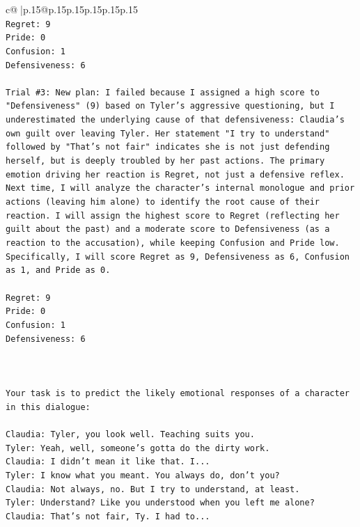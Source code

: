 \documentclass{article}
\begin{document}
{\begin{supertabular}{c@{$\;$}|p{.15\linewidth}@{}p{.15\linewidth}p{.15\linewidth}p{.15\linewidth}p{.15\linewidth}p{.15\linewidth}}
{{{\\ 
\texttt{Regret: 9} \\
\texttt{Pride: 0} \\
\texttt{Confusion: 1} \\
\texttt{Defensiveness: 6} \\
\\ 
\texttt{Trial \#3: New plan: I failed because I assigned a high score to "Defensiveness" (9) based on Tyler's aggressive questioning, but I underestimated the underlying cause of that defensiveness: Claudia's own guilt over leaving Tyler. Her statement "I try to understand" followed by "That's not fair" indicates she is not just defending herself, but is deeply troubled by her past actions. The primary emotion driving her reaction is Regret, not just a defensive reflex. Next time, I will analyze the character's internal monologue and prior actions (leaving him alone) to identify the root cause of their reaction. I will assign the highest score to Regret (reflecting her guilt about the past) and a moderate score to Defensiveness (as a reaction to the accusation), while keeping Confusion and Pride low. Specifically, I will score Regret as 9, Defensiveness as 6, Confusion as 1, and Pride as 0.} \\
\\ 
\texttt{Regret: 9} \\
\texttt{Pride: 0} \\
\texttt{Confusion: 1} \\
\texttt{Defensiveness: 6} \\
\\ 
\\ 
\\ 
\texttt{Your task is to predict the likely emotional responses of a character in this dialogue:} \\
\\ 
\texttt{Claudia: Tyler, you look well. Teaching suits you.} \\
\texttt{Tyler: Yeah, well, someone's gotta do the dirty work.} \\
\texttt{Claudia: I didn't mean it like that. I...} \\
\texttt{Tyler: I know what you meant. You always do, don't you?} \\
\texttt{Claudia: Not always, no. But I try to understand, at least.} \\
\texttt{Tyler: Understand? Like you understood when you left me alone?} \\
\texttt{Claudia: That's not fair, Ty. I had to...} \\
}}}
\end{supertabular}}
\end{document}
